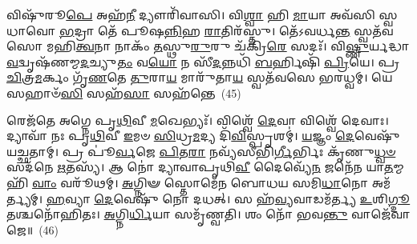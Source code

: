 𑌵𑌿𑌷𑍁᳴𑌰𑍂\-\ul{𑌪𑍇} 𑌅𑌹᳴\-\ul{𑌨𑍀} 𑌦𑍍𑌯𑍗𑌰𑌿᳴𑌵𑌾𑌸𑌿। 𑌵𑌿\-\ul{𑌶𑍍𑌵𑌾} 𑌹𑌿 \ul{𑌮𑌾}\-𑌯𑌾 𑌅𑌵᳴𑌸𑌿 𑌸𑍍𑌵𑌧𑌾𑌵𑍋 \ul{𑌭}\-𑌦𑍍𑌰𑌾 𑌤𑍇᳴ 𑌪𑍂𑌷\-\ul{𑌨𑍍𑌨𑌿}\-𑌹 \ul{𑌰𑌾}\-𑌤𑌿𑌰᳴𑌸𑍍𑌤𑍁। 𑌤𑍇᳴\-𑌽𑌵𑌰𑍍𑌧\-\ul{𑌨𑍍𑌤} 𑌸𑍍𑌵𑌤᳴𑌵𑌸𑍋 𑌮𑌹𑌿\-\ul{𑌤𑍍𑌵}\-𑌨𑌾 𑌨𑌾𑌕𑌂᳴ \ul{𑌤}\-𑌸𑍍𑌥𑍁\-\ul{𑌰𑍁}\-𑌰𑍁 𑌚᳴𑌕𑍍𑌰𑌿\-\ul{𑌰𑍇} 𑌸𑌦𑌃᳴। 𑌵𑌿\-\ul{𑌷𑍍𑌣𑍁}\-𑌰𑍍𑌯𑌦𑍍𑌧𑌾\-\ul{𑌵}\-𑌦𑍍𑌵𑍃𑌷᳴𑌣𑌮𑍍𑌮\-\ul{𑌦}\-𑌚𑍍𑌯𑍁\-\ul{𑌤𑌂} 𑌵\-\ul{𑌯𑍋} 𑌨 𑌸𑍀᳴\-\ul{𑌦}\-𑌨𑍍𑌨𑌧𑌿᳴ \ul{𑌬}\-𑌰𑍍\mbox{}𑌹𑌿𑌷𑌿᳴ \ul{𑌪𑍍𑌰𑌿}\-𑌯𑍇। 𑌪𑍍𑌰 \ul{𑌚𑌿}\-𑌤𑍍𑌰\-\ul{𑌮}\-𑌰𑍍𑌕𑌂 𑌗𑍃᳴\-\ul{𑌣}\-𑌤𑍇 \ul{𑌤𑍁}\-𑌰𑌾\-\ul{𑌯} 𑌮𑌾𑌰𑍁᳴𑌤𑌾\-\ul{𑌯} 𑌸𑍍𑌵𑌤᳴𑌵𑌸𑍇 𑌭𑌰𑌧𑍍𑌵𑌮𑍍। 𑌯𑍇 𑌸𑌹𑌾𑍞᳴\-\ul{𑌸𑌿} 𑌸𑌹᳴\-\ul{𑌸𑌾} 𑌸𑌹᳴𑌨𑍍𑌤𑍇~(45)

𑌰𑍇𑌜᳴𑌤𑍇 𑌅𑌗𑍍𑌨𑍇 𑌪𑍃\-\ul{𑌥𑌿}\-𑌵𑍀 \ul{𑌮}\-𑌖𑍇𑌭𑍍𑌯𑌃᳴। 𑌵𑌿𑌶𑍍𑌵𑍇᳴ \ul{𑌦𑍇}\-𑌵𑌾 𑌵𑌿𑌶𑍍𑌵𑍇᳴ 𑌦𑍇𑌵𑌾𑌃। 𑌦𑍍𑌯𑌾𑌵𑌾᳴ 𑌨𑌃 𑌪𑍃\-\ul{𑌥𑌿}\-𑌵𑍀 \ul{𑌇}\-𑌮𑍞 \ul{𑌸𑌿}\-𑌧𑍍𑌰\-\ul{𑌮}\-𑌦𑍍𑌯 𑌦𑌿᳴\-\ul{𑌵𑌿}\-𑌸𑍍𑌪𑍃𑌶𑌮𑍍॑। \ul{𑌯}\-𑌜𑍍𑌞𑌂 \ul{𑌦𑍇}\-𑌵𑍇𑌷𑍁᳴ 𑌯𑌚𑍍𑌛𑌤𑌾𑌮𑍍। 𑌪𑍍𑌰 𑌪𑍂॑\-\ul{𑌰𑍍𑌵}\-𑌜𑍇 \ul{𑌪𑌿}\-𑌤\-\ul{𑌰𑌾} 𑌨𑌵𑍍𑌯᳴𑌸𑍀𑌭𑌿\-\ul{𑌰𑍍𑌗𑍀}\-𑌰𑍍𑌭𑌿𑌃 𑌕𑍃᳴𑌣𑍁\-\ul{𑌧𑍍𑌵}\-\-\ul{𑍞} 𑌸𑌦᳴𑌨𑍇 \ul{𑌋}\-𑌤𑌸𑍍𑌯᳴। 𑌆 𑌨𑍋॑ 𑌦𑍍𑌯𑌾𑌵𑌾𑌪𑍃𑌥𑌿\-\ul{𑌵𑍀} 𑌦𑍈𑌵𑍍𑌯𑍇᳴\-\ul{𑌨} 𑌜𑌨𑍇᳴𑌨 𑌯𑌾\-\ul{𑌤}\-𑌮𑍍𑌮𑌹𑌿᳴ \ul{𑌵𑌾𑌂} 𑌵𑌰𑍂᳴𑌥𑌮𑍍। \ul{𑌅}\-𑌗𑍍𑌨𑌿𑍟 𑌸𑍍𑌤𑍋𑌮𑍇᳴𑌨 𑌬𑍋𑌧𑌯 𑌸𑌮𑌿\-\ul{𑌧𑌾}\-𑌨𑍋 𑌅𑌮᳴𑌰𑍍𑌤𑍍𑌯𑌮𑍍। \ul{𑌹}\-𑌵𑍍𑌯𑌾 \ul{𑌦𑍇}\-𑌵𑍇𑌷𑍁᳴ 𑌨𑍋 𑌦𑌧𑌤𑍍। 𑌸 𑌹᳴\-\ul{𑌵𑍍𑌯}\-𑌵𑌾𑌡𑌮᳴𑌰𑍍𑌤𑍍𑌯 \ul{𑌉}\-𑌶𑌿\-\ul{𑌗𑍍𑌦𑍂}\-𑌤𑌶𑍍𑌚𑌨𑍋᳴𑌹𑌿𑌤𑌃। \ul{𑌅}\-𑌗𑍍𑌨𑌿\-\ul{𑌰𑍍𑌧𑌿}\-𑌯𑌾 𑌸𑌮𑍃᳴𑌣𑍍𑌵𑌤𑌿। 𑌶𑌂 𑌨𑍋᳴ 𑌭𑌵\-\ul{𑌨𑍍𑌤𑍁} 𑌵𑌾𑌜𑍇᳴𑌵𑌾𑌜𑍇॥~(46)

{\anuvakamend[{\-\ul{𑌪𑍂}\-\-\ul{𑌰𑍁}\-\-\ul{𑌷}\-𑌤𑍍𑌵𑌤𑌾᳴ 𑌯\-\ul{𑌜}\-𑌤𑌨𑍍𑌤𑍇᳴ \ul{𑌅}\-𑌨𑍍𑌯𑌥𑍍𑌸𑌹᳴\-\ul{𑌨𑍍𑌤𑍇} 𑌚𑌨𑍋᳴𑌹𑌿\-\ul{𑌤𑍋}\-\-𑌽𑌷𑍍𑌟𑍗 𑌚᳴}]}%


{\anuvakamend[{𑌵𑌿\-\ul{𑌷𑍍𑌣𑍋𑌃} 𑌕𑍍𑌰𑌮𑍋᳴\-𑌽𑌸𑌿 \ul{𑌦𑌿}\-𑌵𑌸𑍍𑌪𑌰𑍍𑌯𑌨𑍍𑌨᳴\-\ul{𑌪}\-𑌤𑍇\-𑌽𑌪𑍇᳴\-\ul{𑌤} 𑌸𑌮𑌿᳴\-\ul{𑌤𑌂} 𑌯𑌾 \ul{𑌜𑌾}\-𑌤𑌾 𑌮𑌾 𑌨𑍋᳴ 𑌹𑌿𑍞𑌸𑍀\-\ul{𑌦𑍍𑌧𑍍𑌰𑍁}\-𑌵𑌾\-𑌽𑌸𑍍𑌯𑌾᳴\-\ul{𑌦𑌿}\-𑌤𑍍𑌯𑌙𑍍𑌗\-\ul{𑌰𑍍𑌭}\-𑌮𑌿𑌨𑍍𑌦𑍍𑌰𑌾॑𑌗𑍍𑌨𑍀 𑌰𑍋\-\ul{𑌚}\-𑌨𑍈𑌕𑌾᳴\-𑌦𑌶}]}%

